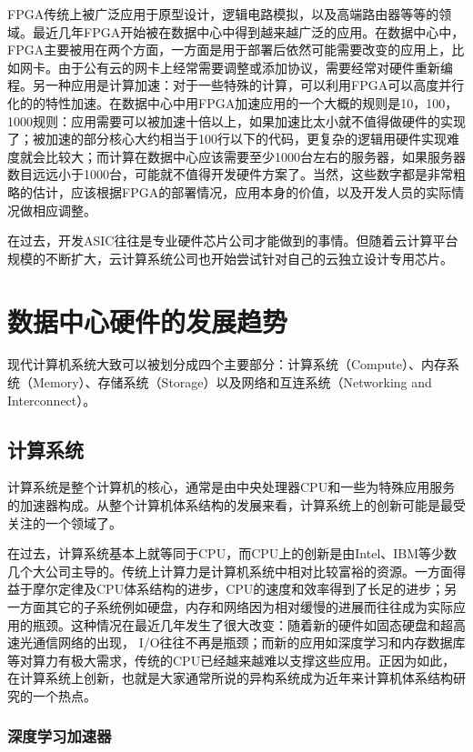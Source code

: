 FPGA传统上被广泛应用于原型设计，逻辑电路模拟，以及高端路由器等等的领域。最近几年FPGA开始被在数据中心中得到越来越广泛的应用。在数据中心中，FPGA主要被用在两个方面，一方面是用于部署后依然可能需要改变的应用上，比如网卡。由于公有云的网卡上经常需要调整或添加协议，需要经常对硬件重新编程。另一种应用是计算加速：对于一些特殊的计算，可以利用FPGA可以高度并行化的的特性加速。在数据中心中用FPGA加速应用的一个大概的规则是10，100，1000规则：应用需要可以被加速十倍以上，如果加速比太小就不值得做硬件的实现了；被加速的部分核心大约相当于100行以下的代码，更复杂的逻辑用硬件实现难度就会比较大；而计算在数据中心应该需要至少1000台左右的服务器，如果服务器数目远远小于1000台，可能就不值得开发硬件方案了。当然，这些数字都是非常粗略的估计，应该根据FPGA的部署情况，应用本身的价值，以及开发人员的实际情况做相应调整。

在过去，开发ASIC往往是专业硬件芯片公司才能做到的事情。但随着云计算平台规模的不断扩大，云计算系统公司也开始尝试针对自己的云独立设计专用芯片。
\fi

\section{数据中心硬件的发展趋势}



现代计算机系统大致可以被划分成四个主要部分：计算系统（Compute）、内存系统（Memory）、存储系统（Storage）以及网络和互连系统（Networking and Interconnect）。


\subsection{计算系统}

计算系统是整个计算机的核心，通常是由中央处理器CPU和一些为特殊应用服务的加速器构成。从整个计算机体系结构的发展来看，计算系统上的创新可能是最受关注的一个领域了。

在过去，计算系统基本上就等同于CPU，而CPU上的创新是由Intel、IBM等少数几个大公司主导的。传统上计算力是计算机系统中相对比较富裕的资源。一方面得益于摩尔定律及CPU体系结构的进步，CPU的速度和效率得到了长足的进步；另一方面其它的子系统例如硬盘，内存和网络因为相对缓慢的进展而往往成为实际应用的瓶颈。这种情况在最近几年发生了很大改变：随着新的硬件如固态硬盘和超高速光通信网络的出现， I/O往往不再是瓶颈；而新的应用如深度学习和内存数据库等对算力有极大需求，传统的CPU已经越来越难以支撑这些应用。正因为如此，在计算系统上创新，也就是大家通常所说的异构系统成为近年来计算机体系结构研究的一个热点。

\subsubsection{深度学习加速器}

